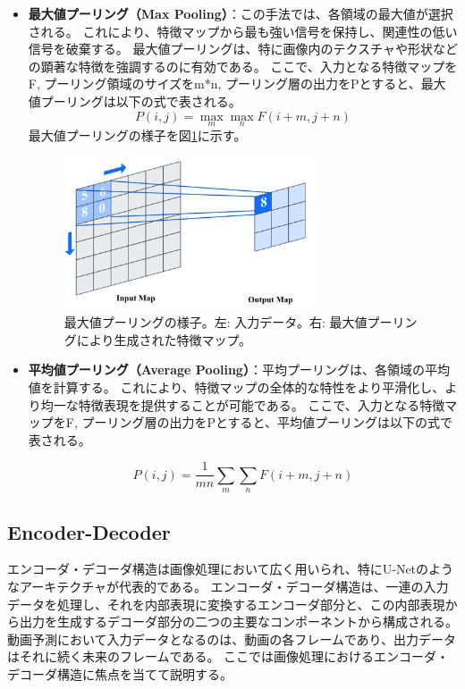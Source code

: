         \begin{itemize}
        \item \textbf{最大値プーリング（Max Pooling）}：この手法では、各領域の最大値が選択される。
        これにより、特徴マップから最も強い信号を保持し、関連性の低い信号を破棄する。
        最大値プーリングは、特に画像内のテクスチャや形状などの顕著な特徴を強調するのに有効である。
        ここで、入力となる特徴マップをF, プーリング領域のサイズをm*n, プーリング層の出力をPとすると、最大値プーリングは以下の式で表される。
        \begin{equation}
          P(i, j) = \max_{m}\max_{n}F(i+m, j+n)
        \end{equation}
        最大値プーリングの様子を図\ref{fig:maxpooling}に示す。
        \begin{figure}[htbp]
          \centering
          \includegraphics[width=0.7\textwidth]{figures/videoprediction/pooling.jpg}
          \caption{最大値プーリングの様子。左: 入力データ。右: 最大値プーリングにより生成された特徴マップ。}
          \label{fig:maxpooling}
        \end{figure}

        \item \textbf{平均値プーリング（Average Pooling）}：平均プーリングは、各領域の平均値を計算する。
        これにより、特徴マップの全体的な特性をより平滑化し、より均一な特徴表現を提供することが可能である。
        ここで、入力となる特徴マップをF, プーリング層の出力をPとすると、平均値プーリングは以下の式で表される。

        \begin{equation}
          P(i, j) = \frac{1}{mn}\sum_{m}\sum_{n}F(i+m, j+n)
        \end{equation}
        
        \end{itemize}
      

    \subsection{Encoder-Decoder}
      エンコーダ・デコーダ構造は画像処理において広く用いられ、特にU-Netのようなアーキテクチャが代表的である。
      エンコーダ・デコーダ構造は、一連の入力データを処理し、それを内部表現に変換するエンコーダ部分と、この内部表現から出力を生成するデコーダ部分の二つの主要なコンポーネントから構成される。
      動画予測において入力データとなるのは、動画の各フレームであり、出力データはそれに続く未来のフレームである。
      ここでは画像処理におけるエンコーダ・デコーダ構造に焦点を当てて説明する。
        
